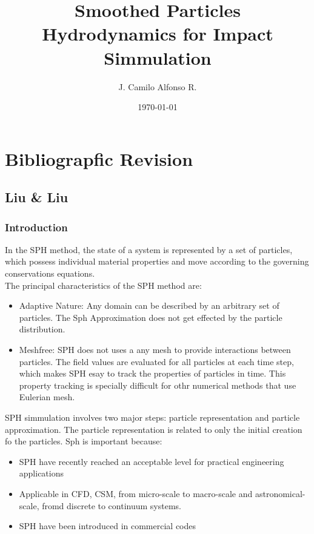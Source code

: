 \documentclass[12pt]{thesis}
\begin{document}
\title{Smoothed Particles Hydrodynamics for Impact Simmulation}
\author{J. Camilo Alfonso R.}
\date{\today}
\maketitle

\tableofcontents

\part{Bibliograpfic Revision}

\chapter{Liu \& Liu}

\section{Introduction}
In the SPH method, the state of a system is represented by a set of particles, which possess individual material properties and move according to the governing conservations equations.\\
The principal characteristics of the SPH method are:
\begin{itemize}
\item Adaptive Nature: Any domain can be described by an arbitrary set of particles. The Sph Approximation does not get effected by the particle distribution.
\item Meshfree: SPH does not uses a any mesh to provide interactions between particles. The field values are evaluated for all particles at each time step, which makes SPH esay to track the properties of particles in time. This property tracking is specially difficult for othr numerical methods that use Eulerian mesh.
\end{itemize} 
SPH simmulation involves two major steps: particle representation and particle approximation. The particle representation is related to only the initial creation fo the particles.
Sph is important because:
\begin{itemize}
\item SPH have recently reached an acceptable level for practical engineering applications
\item Applicable in CFD, CSM, from micro-scale to macro-scale and astronomical-scale, fromd discrete to continuum systems.
\item SPH have been introduced in commercial codes \cite{Liu_SPH}
\end{itemize}
\end{document}
